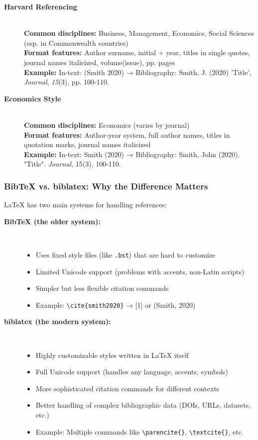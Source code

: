 \documentclass[11pt,a4paper]{ltxdoc}
\begin{document}
\begin{description}
  \item[\textbf{Harvard Referencing}] \hfill \\
  \textbf{Common disciplines:} Business, Management, Economics, Social Sciences (esp. in Commonwealth countries) \\
  \textbf{Format features:} Author surname, initial + year, titles in single quotes, journal names italicized, volume(issue), pp. pages \\
  \textbf{Example:} In-text: (Smith 2020) → Bibliography: Smith, J. (2020) 'Title', \emph{Journal}, \emph{15}(3), pp. 100-110.
  
  \item[\textbf{Economics Style}] \hfill \\
  \textbf{Common disciplines:} Economics (varies by journal) \\
  \textbf{Format features:} Author-year system, full author names, titles in quotation marks, journal names italicized \\
  \textbf{Example:} In-text: Smith (2020) → Bibliography: Smith, John (2020). "Title". \emph{Journal}, 15(3), 100-110.
\end{description}

\subsubsection{BibTeX vs. biblatex: Why the Difference Matters}

LaTeX has two main systems for handling references:

\begin{description}
  \item[\textbf{BibTeX (the older system):}] \hfill \\
  \begin{itemize}
    \item Uses fixed style files (like \texttt{.bst}) that are hard to customize
    \item Limited Unicode support (problems with accents, non-Latin scripts)
    \item Simpler but less flexible citation commands
    \item Example: \texttt{\textbackslash cite\{smith2020\}} → [1] or (Smith, 2020)
  \end{itemize}
  
  \item[\textbf{biblatex (the modern system):}] \hfill \\
  \begin{itemize}
    \item Highly customizable styles written in LaTeX itself
    \item Full Unicode support (handles any language, accents, symbols)
    \item More sophisticated citation commands for different contexts
    \item Better handling of complex bibliographic data (DOIs, URLs, datasets, etc.)
    \item Example: Multiple commands like \texttt{\textbackslash parencite\{\}}, \texttt{\textbackslash textcite\{\}}, etc.
  \end{itemize}
\end{description}
\end{document}
